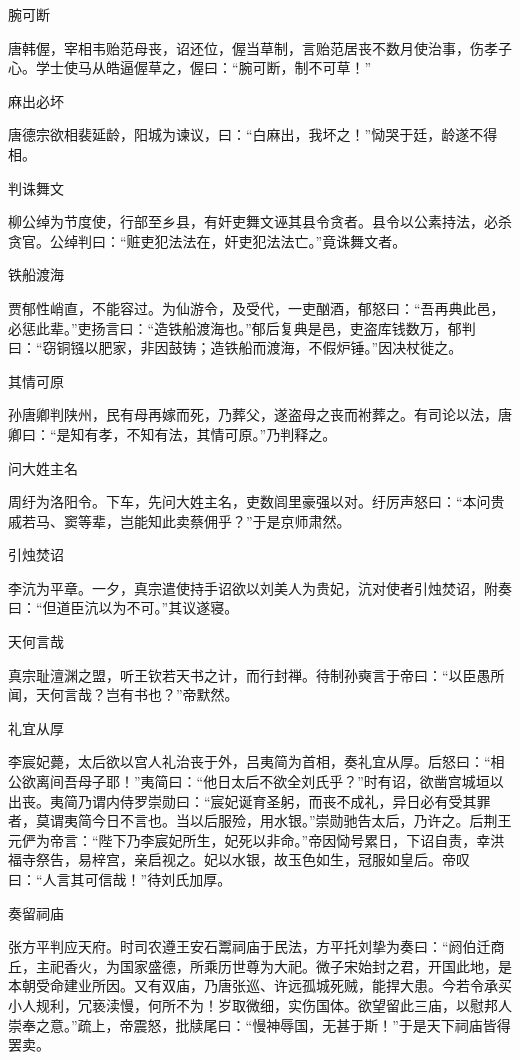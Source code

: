 \documentclass[a4paper,12pt,UTF8,twoside]{ctexbook}
\begin{document}
    腕可断
    
    唐韩偓，宰相韦贻范母丧，诏还位，偓当草制，言贻范居丧不数月使治事，伤孝子心。学士使马从皓逼偓草之，偓曰：“腕可断，制不可草！”
    
    麻出必坏
    
    唐德宗欲相裴延龄，阳城为谏议，曰：“白麻出，我坏之！”恸哭于廷，龄遂不得相。
    
    判诛舞文
    
    柳公绰为节度使，行部至乡县，有奸吏舞文诬其县令贪者。县令以公素持法，必杀贪官。公绰判曰：“赃吏犯法法在，奸吏犯法法亡。”竟诛舞文者。
    
    铁船渡海
    
    贾郁性峭直，不能容过。为仙游令，及受代，一吏酗酒，郁怒曰：“吾再典此邑，必惩此辈。”吏扬言曰：“造铁船渡海也。”郁后复典是邑，吏盗库钱数万，郁判曰：“窃铜镪以肥家，非因鼓铸；造铁船而渡海，不假炉锤。”因决杖徙之。
    
    其情可原
    
    孙唐卿判陕州，民有母再嫁而死，乃葬父，遂盗母之丧而袝葬之。有司论以法，唐卿曰：“是知有孝，不知有法，其情可原。”乃判释之。
    
    问大姓主名
    
    周纡为洛阳令。下车，先问大姓主名，吏数闾里豪强以对。纡厉声怒曰：“本问贵戚若马、窦等辈，岂能知此卖蔡佣乎？”于是京师肃然。
    
    引烛焚诏
    
    李沆为平章。一夕，真宗遣使持手诏欲以刘美人为贵妃，沆对使者引烛焚诏，附奏曰：“但道臣沆以为不可。”其议遂寝。
    
    天何言哉
    
    真宗耻澶渊之盟，听王钦若天书之计，而行封禅。待制孙奭言于帝曰：“以臣愚所闻，天何言哉？岂有书也？”帝默然。
    
    礼宜从厚
    
    李宸妃薨，太后欲以宫人礼治丧于外，吕夷简为首相，奏礼宜从厚。后怒曰：“相公欲离间吾母子耶！”夷简曰：“他日太后不欲全刘氏乎？”时有诏，欲凿宫城垣以出丧。夷简乃谓内侍罗崇勋曰：“宸妃诞育圣躬，而丧不成礼，异日必有受其罪者，莫谓夷简今日不言也。当以后服殓，用水银。”崇勋驰告太后，乃许之。后荆王元俨为帝言：“陛下乃李宸妃所生，妃死以非命。”帝因恸号累日，下诏自责，幸洪福寺祭告，易梓宫，亲启视之。妃以水银，故玉色如生，冠服如皇后。帝叹曰：“人言其可信哉！”待刘氏加厚。
    
    奏留祠庙
    
    张方平判应天府。时司农遵王安石鬻祠庙于民法，方平托刘挚为奏曰：“阏伯迁商丘，主祀香火，为国家盛德，所乘历世尊为大祀。微子宋始封之君，开国此地，是本朝受命建业所因。又有双庙，乃唐张巡、许远孤城死贼，能捍大患。今若令承买小人规利，冗亵渎慢，何所不为！岁取微细，实伤国体。欲望留此三庙，以慰邦人崇奉之意。”疏上，帝震怒，批牍尾曰：“慢神辱国，无甚于斯！”于是天下祠庙皆得罢卖。
    
\end{document}
